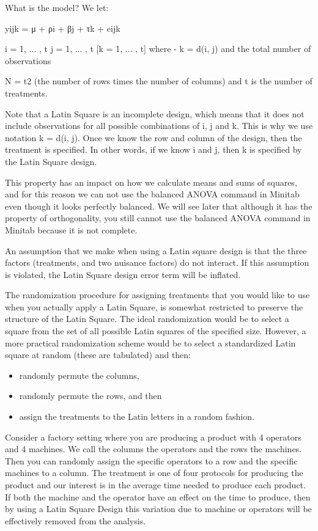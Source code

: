 What is the model? We let:

yijk = μ + ρi + βj + τk + eijk

i = 1, ... , t
j = 1, ... , t
[k = 1, ... , t] where - k = d(i, j) and the total number of observations

N = t2 (the number of rows times the number of columns) and t is the number of treatments.

Note that a Latin Square is an incomplete design, which means that it does not include observations for all possible combinations of i, j and k.  This is why we use notation k = d(i, j).  Once we know the row and column of the design, then the treatment is specified. In other words, if we know i and j, then k is specified by the Latin Square design.

This property has an impact on how we calculate means and sums of squares, and for this reason we can not use the balanced ANOVA command in Minitab even though it looks perfectly balanced. We will see later that although it has the property of orthogonality, you still cannot use the balanced ANOVA command in Minitab because it is not complete.

An assumption that we make when using a Latin square design is that the three factors (treatments, and two nuisance factors) do not interact. If this assumption is violated, the Latin Square design error term will be inflated.

The randomization procedure for assigning treatments that you would like to use when you actually apply a Latin Square, is somewhat restricted to preserve the structure of the Latin Square. The ideal randomization would be to select a square from the set of all possible Latin squares of the specified size.  However, a more practical randomization scheme would be to select a standardized Latin square at random (these are tabulated) and then:

\begin{itemize}
	\item randomly permute the columns,
	\item randomly permute the rows, and then
	\item assign the treatments to the Latin letters in a random fashion.
\end{itemize}
Consider  a factory setting where you are producing a product with 4 operators and 4 machines. We call the columns the operators and the rows the machines. Then you can randomly assign the specific operators to a row and the specific machines to a column. The treatment is one of four protocols for producing the product and our interest is in the average time needed to produce each product.  If both the machine and the operator have an effect on the time to produce, then by using a Latin Square Design this variation due to machine or operators will be effectively removed from the analysis.

